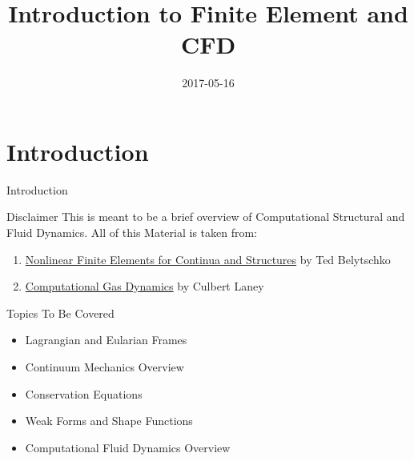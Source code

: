 \documentclass{beamer}
\title{Introduction to Finite Element and CFD}
\institute{Corvid Technologies}
\date{2017-05-16}
\begin{document}
\frame{\titlepage}

\section{Introduction}
\begin{frame}{Introduction}
\begin{block}{Disclaimer}
	This is meant to be a brief overview of Computational Structural and Fluid Dynamics.
	All of this Material is taken from:
	\begin{enumerate}
		\item \underline{Nonlinear Finite Elements for Continua and Structures} by Ted Belytschko 
		\item \underline{Computational Gas Dynamics} by Culbert Laney
	\end{enumerate}
\end{block}
\begin{block}{Topics To Be Covered}
\begin{itemize}
	\item Lagrangian and Eularian Frames
	\item Continuum Mechanics Overview
	\item Conservation Equations
	\item Weak Forms and Shape Functions
	\item Computational Fluid Dynamics Overview
\end{itemize}
\end{block}
\end{frame}
\end{document}
